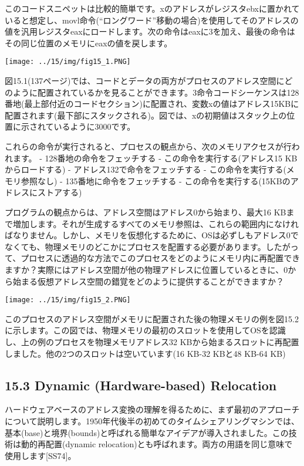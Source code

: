 このコードスニペットは比較的簡単です。xのアドレスがレジスタebxに置かれていると想定し、movl命令(``ロングワード''移動の場合)を使用してそのアドレスの値を汎用レジスタeaxにロードします。次の命令はeaxに3を加え、最後の命令はその同じ位置のメモリにeaxの値を戻します。

\texttt{[image: ../15/img/fig15\_1.PNG]}

図15.1(137ページ)では、コードとデータの両方がプロセスのアドレス空間にどのように配置されているかを見ることができます。3命令コードシーケンスは128番地(最上部付近のコードセクション)に配置され、変数xの値はアドレス15KBに配置されます(最下部にスタックされる)。図では、xの初期値はスタック上の位置に示されているように3000です。

これらの命令が実行されると、プロセスの観点から、次のメモリアクセスが行われます。
- 128番地の命令をフェッチする - この命令を実行する(アドレス15
K\hspace{0pt}\hspace{0pt}Bからロードする) -
アドレス132で命令をフェッチする - この命令を実行する(メモリ参照なし) -
135番地に命令をフェッチする -
この命令を実行する(15KBのアドレスにストアする)

プログラムの観点からは、アドレス空間はアドレス0から始まり、最大16
KBまで増加します。それが生成するすべてのメモリ参照は、これらの範囲内になければなりません。しかし、メモリを仮想化するために、OSは必ずしもアドレス0でなくても、物理メモリのどこかにプロセスを配置する必要があります。したがって、プロセスに透過的な方法でこのプロセスをどのようにメモリ内に再配置できますか？実際にはアドレス空間が他の物理アドレスに位置しているときに、0から始まる仮想アドレス空間の錯覚をどのように提供することができますか？

\texttt{[image: ../15/img/fig15\_2.PNG]}

このプロセスのアドレス空間がメモリに配置された後の物理メモリの例を図15.2に示します。この図では、物理メモリの最初のスロットを使用してOSを認識し、上の例のプロセスを物理メモリアドレス32
KBから始まるスロットに再配置しました。他の2つのスロットは空いています(16
KB-32 KBと48 KB-64 KB)

\hypertarget{dynamic-hardware-based-relocation}{%
\subsection*{15.3 Dynamic (Hardware-based)
Relocation}\label{dynamic-hardware-based-relocation}}

ハードウェアベースのアドレス変換の理解を得るために、まず最初のアプローチについて説明します。1950年代後半の初めてのタイムシェアリングマシンでは、基本(base)と境界(bounds)と呼ばれる簡単なアイデアが導入されました。この技術は動的再配置(dynamic
relocation)とも呼ばれます。両方の用語を同じ意味で使用します{[}SS74{]}。

